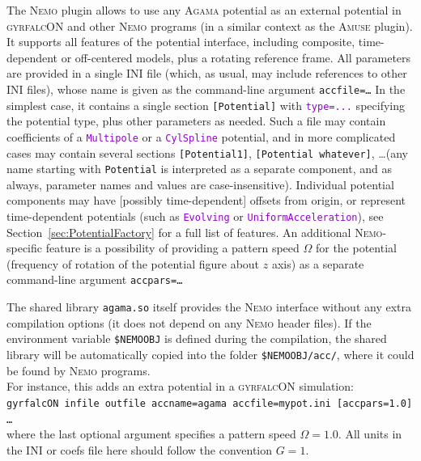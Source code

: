 \documentclass[12pt]{article}
\newcommand{\Agama}{\textsc{Agama}\xspace}
\newcommand{\Amuse}{\textsc{Amuse}\xspace}
\newcommand{\Nemo} {\textsc{Nemo}\xspace}
\newcommand{\ttt}[1]{\textcolor{darkviolet}{\texttt{#1}}}
\newcommand{\ppp}[1]{\textcolor{darkolive} {\texttt{#1}}}
\begin{document}
The \Nemo plugin allows to use any \Agama potential as an external potential in \textsc{gyrfalcON} and other \Nemo programs (in a similar context as the \Amuse plugin). It supports all features of the potential interface, including composite, time-dependent or off-centered models, plus a rotating reference frame. 
All parameters are provided in a single INI file (which, as usual, may include references to other INI files), whose name is given as the command-line argument \texttt{accfile=\dots} In the simplest case, it contains a single section \ppp{[Potential]} with \ttt{type=...} specifying the potential type, plus other parameters as needed. Such a file may contain coefficients of a \ttt{Multipole} or a \ttt{CylSpline} potential, and in more complicated cases may contain several sections  \ppp{[Potential1]}, \ppp{[Potential whatever]}, \dots (any name starting with \ppp{Potential} is interpreted as a separate component, and as always, parameter names and values are case-insensitive). Individual potential components may have [possibly time-dependent] offsets from origin, or represent time-dependent potentials (such as \ttt{Evolving} or \ttt{UniformAcceleration}), see Section~\ref{sec:PotentialFactory} for a full list of features. An additional \Nemo-specific feature is a possibility of providing a pattern speed $\Omega$ for the potential (frequency of rotation of the potential figure about $z$ axis) as a separate command-line argument \texttt{accpars=\dots}

The shared library \texttt{agama.so} itself provides the \Nemo interface without any extra compilation options (it does not depend on any \Nemo header files). If the environment variable \texttt{\$NEMOOBJ} is defined during the compilation, the shared library will be automatically copied into the folder \texttt{\$NEMOOBJ/acc/}, where it could be found by \Nemo programs.\\
For instance, this adds an extra potential in a \textsc{gyrfalcON}  simulation:\\[2mm]
\texttt{gyrfalcON infile outfile accname=agama accfile=mypot.ini [accpars=1.0] \dots}\\[2mm]
where the last optional argument specifies a pattern speed $\Omega=1.0$. All units in the INI or coefs file here should follow the convention $G=1$.
\end{document}
